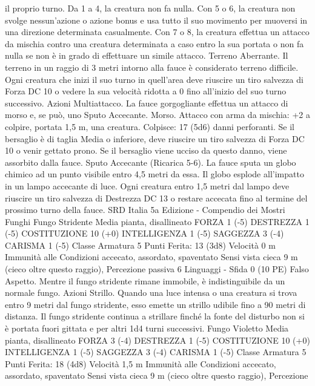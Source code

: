 \begin{multicols}{2}
il proprio turno. Da 1 a 4, la creatura non fa nulla. Con 5 o 6, la
creatura non svolge nessun’azione o azione bonus e usa tutto il
suo movimento per muoversi in una direzione determinata
casualmente. Con 7 o 8, la creatura effettua un attacco da
mischia contro una creatura determinata a caso entro la sua
portata o non fa nulla se non è in grado di effettuare un simile
attacco.
Terreno Aberrante. Il terreno in un raggio di 3 metri intorno alla
fauce è considerato terreno difficile. Ogni creatura che inizi il
suo turno in quell’area deve riuscire un tiro salvezza di Forza DC
10 o vedere la sua velocità ridotta a 0 fino all’inizio del suo turno
successivo.
Azioni
Multiattacco. La fauce gorgogliante effettua un attacco di morso
e, se può, uno Sputo Accecante.
Morso. Attacco con arma da mischia: +2 a colpire, portata 1,5
m, una creatura.
Colpisce: 17 (5d6) danni perforanti. Se il bersaglio è di taglia
Media o inferiore, deve riuscire un tiro salvezza di Forza DC 10
o venir gettato prono. Se il bersaglio viene ucciso da questo
danno, viene assorbito dalla fauce.
Sputo Accecante (Ricarica 5-6). La fauce sputa un globo
chimico ad un punto visibile entro 4,5 metri da essa. Il globo
esplode all’impatto in un lampo accecante di luce. Ogni creatura
entro 1,5 metri dal lampo deve riuscire un tiro salvezza di
Destrezza DC 13 o restare accecata fino al termine del prossimo
turno della fauce.
SRD Italia 5a Edizione - Compendio dei Mostri
Funghi
Fungo Stridente
Media pianta, disallineato
FORZA 1 (-5)
DESTREZZA 1 (-5)
COSTITUZIONE 10 (+0)
INTELLIGENZA 1 (-5)
SAGGEZZA 3 (-4)
CARISMA 1 (-5)
Classe Armatura 5
\hspace*{0pt}\hfill{Punti Ferita}: 13 (3d8)
Velocità 0 m
Immunità alle Condizioni accecato, assordato, spaventato
Sensi vista cieca 9 m (cieco oltre questo raggio), Percezione
passiva 6
Linguaggi -
Sfida 0 (10 PE)
Falso Aspetto. Mentre il fungo stridente rimane immobile, è
indistinguibile da un normale fungo.
Azioni
Strillo. Quando una luce intensa o una creatura si trova entro 9
metri dal fungo stridente, esso emette un strillo udibile fino a 90
metri di distanza. Il fungo stridente continua a strillare finché la
fonte del disturbo non si è portata fuori gittata e per altri 1d4
turni successivi.
Fungo Violetto
Media pianta, disallineato
FORZA 3 (-4)
DESTREZZA 1 (-5)
COSTITUZIONE 10 (+0)
INTELLIGENZA 1 (-5)
SAGGEZZA 3 (-4)
CARISMA 1 (-5)
Classe Armatura 5
\hspace*{0pt}\hfill{Punti Ferita}: 18 (4d8)
Velocità 1,5 m
Immunità alle Condizioni accecato, assordato, spaventato
Sensi vista cieca 9 m (cieco oltre questo raggio), Percezione

\end{multicols}
